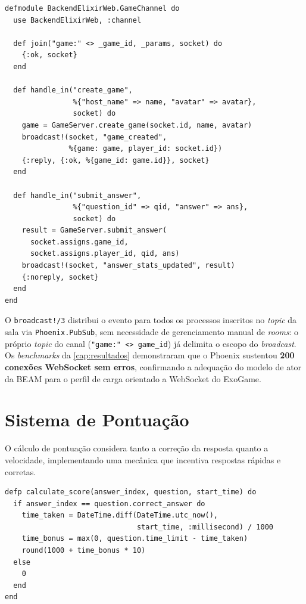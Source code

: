 \documentclass[
	12pt,
	openany,
	oneside,
	a4paper,
	english,
	brazil
]{abntex2}
\begin{document}
\begin{lstlisting}[caption={Canal WebSocket Phoenix/Elixir (\texttt{game\_channel.ex}, trecho)}, label={lst:gateway_elixir}]
defmodule BackendElixirWeb.GameChannel do
  use BackendElixirWeb, :channel

  def join("game:" <> _game_id, _params, socket) do
    {:ok, socket}
  end

  def handle_in("create_game",
                %{"host_name" => name, "avatar" => avatar},
                socket) do
    game = GameServer.create_game(socket.id, name, avatar)
    broadcast!(socket, "game_created",
               %{game: game, player_id: socket.id})
    {:reply, {:ok, %{game_id: game.id}}, socket}
  end

  def handle_in("submit_answer",
                %{"question_id" => qid, "answer" => ans},
                socket) do
    result = GameServer.submit_answer(
      socket.assigns.game_id,
      socket.assigns.player_id, qid, ans)
    broadcast!(socket, "answer_stats_updated", result)
    {:noreply, socket}
  end
end
\end{lstlisting}

O \texttt{broadcast!/3} distribui o evento para todos os processos inscritos no \textit{topic} da sala via \texttt{Phoenix.PubSub}, sem necessidade de gerenciamento manual de \textit{rooms}: o próprio \textit{topic} do canal (\texttt{"game:" <> game\_id}) já delimita o escopo do \textit{broadcast}. Os \textit{benchmarks} da \autoref{cap:resultados} demonstraram que o Phoenix sustentou \textbf{200 conexões WebSocket sem erros}, confirmando a adequação do modelo de ator da BEAM para o perfil de carga orientado a WebSocket do ExoGame.

\section{Sistema de Pontuação}

O cálculo de pontuação considera tanto a correção da resposta quanto a velocidade, implementando uma mecânica que incentiva respostas rápidas e corretas.

\begin{lstlisting}[caption={Algoritmo de pontuação em Elixir (\texttt{game\_server.ex})}, label={lst:pontuacao}]
defp calculate_score(answer_index, question, start_time) do
  if answer_index == question.correct_answer do
    time_taken = DateTime.diff(DateTime.utc_now(),
                               start_time, :millisecond) / 1000
    time_bonus = max(0, question.time_limit - time_taken)
    round(1000 + time_bonus * 10)
  else
    0
  end
end
\end{lstlisting}
\end{document}
